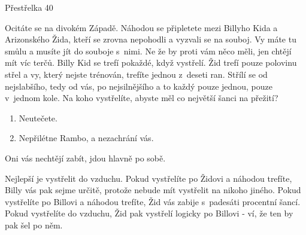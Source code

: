 Přestřelka
40 %

Ocitáte se na divokém Západě. Náhodou se připletete mezi Billyho Kida a Arizonského Žida, kteří se zrovna nepohodli a vyzvali se na souboj. Vy máte tu smůlu a musíte jít do souboje s~nimi. Ne že by proti vám něco měli, jen chtějí mít víc terčů. Billy Kid se trefí pokaždé, když vystřelí. Žid trefí pouze polovinu střel a vy, který nejste trénován, trefíte jednou z~deseti ran. Střílí se od nejslabšího, tedy od vás, po nejsilnějšího a to každý pouze jednou, pouze v~jednom kole. Na koho vystřelíte, abyste měl co největší šanci na přežití?

\begin{enumerate}
\item Neutečete.
\item Nepřilétne Rambo, a nezachrání vás.
\end{enumerate}

Oni vás nechtějí zabít, jdou hlavně po sobě.

Nejlepší je vystřelit do vzduchu. Pokud vystřelíte po Židovi a náhodou trefíte, Billy vás pak sejme určitě, protože nebude mít vystřelit na nikoho jiného. Pokud vystřelíte po Billovi a náhodou trefíte, Žid vás zabije s~padesáti procentní šancí. Pokud vystřelíte do vzduchu, Žid pak vystřelí logicky po Billovi - ví, že ten by pak šel po něm.


